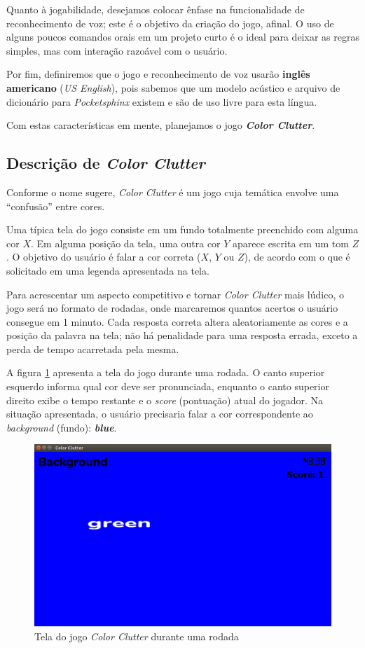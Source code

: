 Quanto à jogabilidade, desejamos colocar ênfase na funcionalidade de reconhecimento de voz; este é o objetivo da criação do jogo, afinal. O uso de alguns poucos comandos orais em um projeto curto é o ideal para deixar as regras simples, mas com interação razoável com o usuário.

Por fim, definiremos que o jogo e reconhecimento de voz usarão \textbf{inglês americano} (\textit{US English}), pois sabemos que um modelo acústico e arquivo de dicionário para \textit{Pocketsphinx} existem e são de uso livre para esta língua.

Com estas características em mente, planejamos o jogo \textbf{\emph{Color Clutter}}.


\subsection{Descrição de \textit{Color Clutter}}

Conforme o nome sugere, \textit{Color Clutter} é um jogo cuja temática envolve uma ``confusão'' entre cores.

Uma típica tela do jogo consiste em um fundo totalmente preenchido com alguma cor \(X\). Em alguma posição da tela, uma outra cor \(Y\) aparece escrita em um tom \(Z\). O objetivo do usuário é falar a cor correta (\(X\), \(Y\) ou \(Z\)), de acordo com o que é solicitado em uma legenda apresentada na tela.

Para acrescentar um aspecto competitivo e tornar \textit{Color Clutter} mais lúdico, o jogo será no formato de rodadas, onde marcaremos quantos acertos o usuário consegue em 1 minuto. Cada resposta correta altera aleatoriamente as cores e a posição da palavra na tela; não há penalidade para uma resposta errada, exceto a perda de tempo acarretada pela mesma.

A figura \ref{color-clutter-screen} apresenta a tela do jogo durante uma rodada. O canto superior esquerdo informa qual cor deve ser pronunciada, enquanto o canto superior direito exibe o tempo restante e o \textit{score} (pontuação) atual do jogador. Na situação apresentada, o usuário precisaria falar a cor correspondente ao \textit{background} (fundo): \textbf{\textit{blue}}.

\begin{figure}[H]
  \centering
  \includegraphics[width=.8\textwidth]{image/color-clutter-screen}
  \caption{Tela do jogo \textit{Color Clutter} durante uma rodada}
  \label{color-clutter-screen}
\end{figure}

